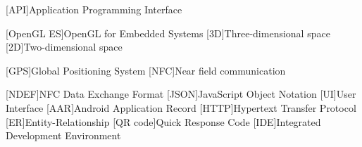 [API]{Application Programming Interface}

[OpenGL ES]{OpenGL for Embedded Systems}
[3D]{Three-dimensional space}
[2D]{Two-dimensional space}

[GPS]{Global Positioning System}
[NFC]{Near field communication}

[NDEF]{NFC Data Exchange Format}
[JSON]{JavaScript Object Notation}
[UI]{User Interface}
[AAR]{Android Application Record}
[HTTP]{Hypertext Transfer Protocol}
[ER]{Entity-Relationship}
[QR code]{Quick Response Code}
[IDE]{Integrated Development Environment}